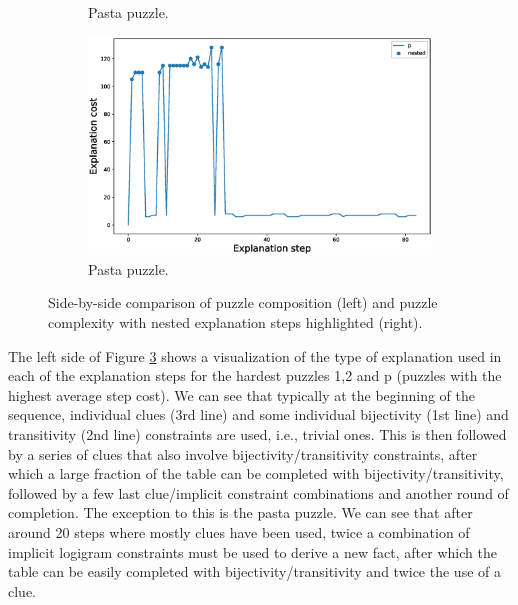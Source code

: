 \begin{figure}[t!]
\begin{subfigure}{.5\textwidth}
				\caption{Pasta puzzle.}
				\label{fig:composition_puzzle:pasta}
		\end{subfigure}%
		\begin{subfigure}{.5\textwidth}
				\centering
				\includegraphics[width=0.84\linewidth]{figures/p.eps}
				\caption{Pasta puzzle.}
				\label{fig:cost_puzzle:pasta}
		\end{subfigure}
		\caption{Side-by-side comparison of puzzle composition (left) and puzzle complexity with nested explanation steps highlighted (right).}
		\label{fig:steps}
\end{figure}


The left side of Figure \ref{fig:steps} shows a visualization of the type of explanation used in each of the explanation steps for the hardest puzzles 1,2 and p (puzzles with the highest average step cost). 
We can see that typically at the beginning of the sequence, individual clues (3rd line) and some individual bijectivity (1st line) and transitivity (2nd line) constraints are used, i.e., trivial ones.
This is then followed by a series of clues that also involve bijectivity/transitivity constraints, after which a large fraction of the table can be completed with bijectivity/transitivity, followed by a few last clue/implicit constraint combinations and another round of completion.
The exception to this is the pasta puzzle.
We can see that after around 20 steps where mostly clues have been used, twice a combination of implicit logigram constraints must be used to derive a new fact, after which the table can be easily completed with bijectivity/transitivity and twice the use of a clue.

